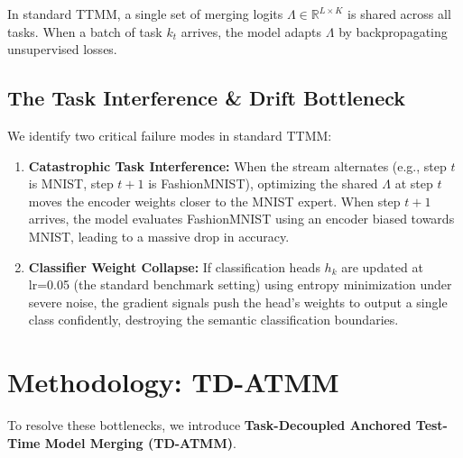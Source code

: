 \documentclass{article}
\theoremstyle{plain}
\theoremstyle{definition}
\theoremstyle{remark}
\begin{document}
In standard TTMM, a single set of merging logits $\Lambda \in \mathbb{R}^{L \times K}$ is shared across all tasks. When a batch of task $k_t$ arrives, the model adapts $\Lambda$ by backpropagating unsupervised losses. 

\subsection{The Task Interference \& Drift Bottleneck}
We identify two critical failure modes in standard TTMM:
\begin{enumerate}
    \item \textbf{Catastrophic Task Interference:} When the stream alternates (e.g., step $t$ is MNIST, step $t+1$ is FashionMNIST), optimizing the shared $\Lambda$ at step $t$ moves the encoder weights closer to the MNIST expert. When step $t+1$ arrives, the model evaluates FashionMNIST using an encoder biased towards MNIST, leading to a massive drop in accuracy.
    \item \textbf{Classifier Weight Collapse:} If classification heads $h_k$ are updated at lr=0.05 (the standard benchmark setting) using entropy minimization under severe noise, the gradient signals push the head's weights to output a single class confidently, destroying the semantic classification boundaries.
\end{enumerate}

\section{Methodology: TD-ATMM}
To resolve these bottlenecks, we introduce \textbf{Task-Decoupled Anchored Test-Time Model Merging (TD-ATMM)}.
\end{document}
